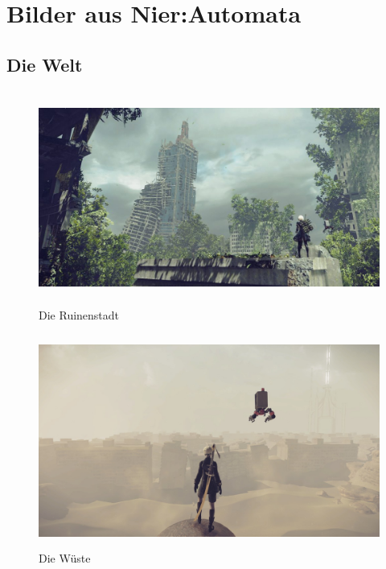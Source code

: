 %
%
%
%

\centering
\chapter{Bilder aus Nier:Automata}

\section{Die Welt}


\begin{figure}[h!]
	\centering
	\includegraphics[width=15cm,height=7cm]{Nier/world/area.jpg}
	\caption{Die Ruinenstadt}
	\label{img:passante}
\end{figure}

\begin{figure}[h!]
	\centering
	\includegraphics[width=15cm,height=7cm]{Nier/world/desert.jpg}
	\caption{Die Wüste}
	\label{img:passante}
\end{figure}


